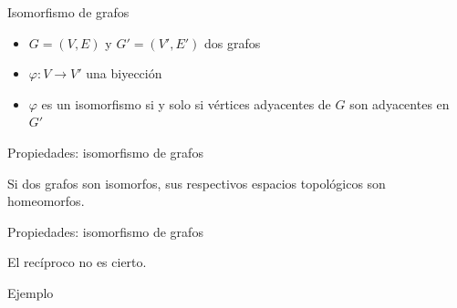 \begin{frame}{Isomorfismo de grafos}
   \begin{itemize}
      \item $G=(V,E)$ y $G'=(V',E')$ dos grafos
      \item $\varphi: V\to V'$ una biyección
      \item $\varphi$ es un \alert{isomorfismo} si y solo si vértices adyacentes de $G$ son adyacentes en $G'$
   \end{itemize}
   \vspace{0.3cm}
   \begin{center}
      
   \end{center}
\end{frame}

\begin{frame}{Propiedades: isomorfismo de grafos}
   \begin{prop}
      Si dos grafos son \alert{isomorfos}, sus respectivos espacios topológicos son \alert{homeomorfos}.\vspace{0.3cm}
   \end{prop}
\end{frame}

\begin{frame}{Propiedades: isomorfismo de grafos}
   \begin{Obs}
      El recíproco no es cierto.\vspace{0.3cm}
   \end{Obs}
   \vspace{0.4cm}
   \noindent\hspace*{10.7pt}\alert{Ejemplo}
   \begin{center}
      
   \end{center}
\end{frame}

